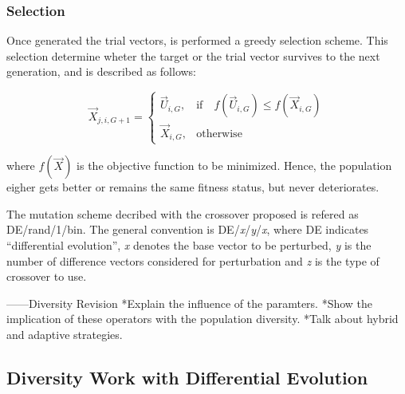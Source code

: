 \subsubsection{Selection}
Once generated the trial vectors, is performed a greedy selection scheme.
%
This selection determine wheter the target or the trial vector survives to the next generation, and is described as follows:

\begin{equation} \label{eqn:selection}
\vec{X}_{j,i,G+1}= 
\begin{cases}
    \vec{U}_{i,G},& \text{if} \quad f(\vec{U}_{i,G}) \leq f(\vec{X}_{i,G})  \\
    \vec{X}_{i,G},              & \text{otherwise}
\end{cases}
\end{equation}

where $f(\vec{X})$ is the objective function to be minimized.
%
Hence, the population eigher gets better or remains the same fitness status, but never deteriorates.

The mutation scheme decribed with the crossover proposed is refered as DE/rand/1/bin.
%
The general convention is DE/\textit{x}/\textit{y}/\textit{x}, where DE indicates ``differential evolution'', \textit{x} denotes the base vector to be perturbed, \textit{y} is the number of difference vectors considered for perturbation and \textit{z} is the type of crossover to use.

------Diversity Revision
*Explain the influence of the paramters.
*Show the implication of these operators with the population diversity.
*Talk about hybrid and adaptive strategies.



\subsection{Diversity Work with Differential Evolution}
